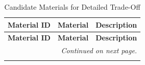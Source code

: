 \begin{longtable}{|c|p{2.25cm}|p{10.75cm}|}
        \caption{Candidate Materials for Detailed Trade-Off}
        \label{tab:materials_trade-off_candidates_desc}\\

\hline
       \textbf{Material ID} & \textbf{Material} & \textbf{Description}\\\hline\hline
\endfirsthead

\hline
       \textbf{Material ID} & \textbf{Material} & \textbf{Description}\\\hline\hline
\endhead

\hline
\multicolumn{3}{r}{\textit{Continued on next page.}} \\
\endfoot

\hline
\endlastfoot


\end{longtable}
